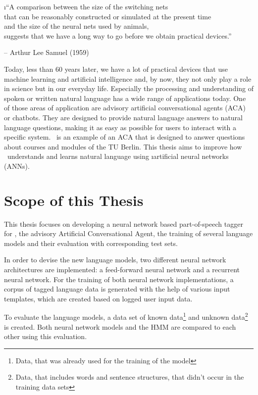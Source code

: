 \vspace{1em}
\i{``A comparison between the size of the switching nets\\that can be reasonably constructed or simulated at the present time\\and the size of the neural nets used by animals,\\suggests that we have a long way to go before we obtain practical devices.''}\\
\parbox{\textwidth}{\hfill \hfill -- Arthur Lee Samuel (1959)}
\vspace{.5em}

Today, less than 60 years later, we have a lot of practical devices that use machine learning and artificial intelligence and, by now, they not only play a role in science but in our everyday life. Especially the processing and understanding of spoken or written natural language has a wide range of applications today. One of those areas of application are advisory artificial conversational agents (ACA) or chatbots. They are designed to provide natural language answers to natural language questions, making it as easy as possible for users to interact with a specific system. \Alex\ is an example of an ACA that is designed to answer questions about courses and modules of the TU Berlin. This thesis aims to improve how \Alex\ understands and learns natural language using \i{artificial neural networks} (ANNs).

\section{Scope of this Thesis}\label{c.introduction.scope}
This thesis focuses on developing a neural network based part-of-speech tagger for \Alex, the advisory Artificial Conversational Agent, the training of several language models and their evaluation with corresponding test sets.

In order to devise the new language models, two different neural network architectures are implemented: a feed-forward neural network and a recurrent neural network. For the training of both neural network implementations, a corpus of tagged language data is generated with the help of various input templates, which are created based on logged user input data.

To evaluate the language models, a data set of known data\footnote{Data, that was already used for the training of the model} and unknown data\footnote{Data, that includes words and sentence structures, that didn't occur in the training data sets} is created. Both neural network models and the HMM are compared to each other using this evaluation.

